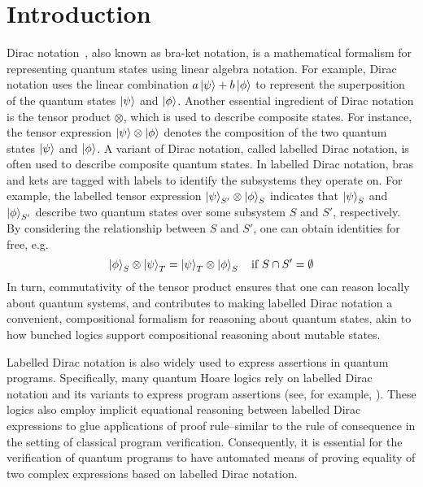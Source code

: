 
\section{Introduction}


Dirac notation~\cite{dirac1939new}, also known as bra-ket notation, is a mathematical formalism for representing quantum states using linear algebra notation. For example, Dirac notation uses the linear combination \( a\ket{\psi} + b\ket{\phi} \) to represent the superposition of the quantum states \( \ket{\psi} \) and \( \ket{\phi} \). Another essential ingredient of Dirac notation is the tensor product $\otimes$, which is used to describe composite states. For instance, the tensor expression \( \ket{\psi} \otimes \ket{\phi} \) denotes the composition of the two quantum states \( \ket{\psi} \) and \( \ket{\phi} \). A variant of Dirac notation, called labelled Dirac notation, is often used to describe composite quantum states. In labelled Dirac notation, bras and kets are tagged with labels to identify the subsystems they operate on. For example, the labelled tensor expression \( \ket{\psi}_{S'} \otimes \ket{\phi}_{S} \) indicates that \( \ket{\psi}_{S} \) and \( \ket{\phi}_{S'} \) describe two quantum states over some subsystem $S$ and $S'$, respectively. By considering the relationship between $S$ and $S'$, one can obtain identities for free, e.g.\, 
%
$$\ket{\phi}_S \otimes \ket{\psi}_{T} = \ket{\psi}_{T} \otimes \ket{\phi}_S \quad \text{if}~S \cap S' = \emptyset$$
%
In turn, commutativity of the tensor product ensures that one can
reason locally about quantum systems, and contributes to making labelled Dirac notation a convenient, compositional formalism for reasoning about quantum states, akin to how bunched logics support compositional reasoning about mutable states.

Labelled Dirac notation is also widely used to express assertions in quantum programs. Specifically, many quantum Hoare logics rely on labelled Dirac notation and its variants to express program assertions (see, for example, \cite{DBLP:conf/lics/ZhouBHYY21} \cite{Zhou2023} \cite{qRHL_unruh2019} \cite{QSL_Le_2022} \cite{Zhong2024-np} \cite{incorrectness_2022} \cite{qafny2024}). These logics also employ implicit equational reasoning between labelled Dirac expressions to glue applications of proof rule--similar to the rule of consequence in the setting of classical program verification. Consequently, it is
essential for the verification of quantum programs to have automated
means of proving equality of two complex expressions based on labelled
Dirac notation.

